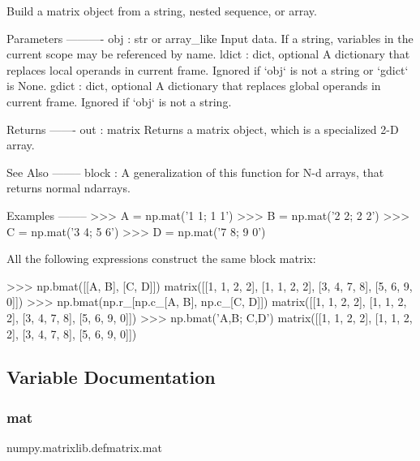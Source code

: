 \begin{DoxyVerb}Build a matrix object from a string, nested sequence, or array.

Parameters
----------
obj : str or array_like
    Input data. If a string, variables in the current scope may be
    referenced by name.
ldict : dict, optional
    A dictionary that replaces local operands in current frame.
    Ignored if `obj` is not a string or `gdict` is None.
gdict : dict, optional
    A dictionary that replaces global operands in current frame.
    Ignored if `obj` is not a string.

Returns
-------
out : matrix
    Returns a matrix object, which is a specialized 2-D array.

See Also
--------
block :
    A generalization of this function for N-d arrays, that returns normal
    ndarrays.

Examples
--------
>>> A = np.mat('1 1; 1 1')
>>> B = np.mat('2 2; 2 2')
>>> C = np.mat('3 4; 5 6')
>>> D = np.mat('7 8; 9 0')

All the following expressions construct the same block matrix:

>>> np.bmat([[A, B], [C, D]])
matrix([[1, 1, 2, 2],
        [1, 1, 2, 2],
        [3, 4, 7, 8],
        [5, 6, 9, 0]])
>>> np.bmat(np.r_[np.c_[A, B], np.c_[C, D]])
matrix([[1, 1, 2, 2],
        [1, 1, 2, 2],
        [3, 4, 7, 8],
        [5, 6, 9, 0]])
>>> np.bmat('A,B; C,D')
matrix([[1, 1, 2, 2],
        [1, 1, 2, 2],
        [3, 4, 7, 8],
        [5, 6, 9, 0]])\end{DoxyVerb}
 

\subsection{Variable Documentation}
\mbox{\label{namespacenumpy_1_1matrixlib_1_1defmatrix_a2d2fc1443b6077c6e5a7989a5331fc62}} 
\subsubsection{\texorpdfstring{mat}{mat}}
{\footnotesize\ttfamily numpy.\+matrixlib.\+defmatrix.\+mat}

